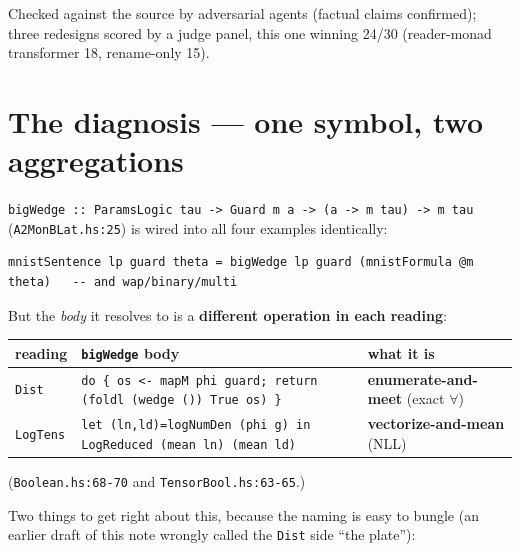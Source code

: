 \documentclass[11pt]{article}
\newcommand{\code}[1]{\texttt{#1}}
\begin{document}
Checked against the source by adversarial agents (factual claims confirmed); three redesigns scored by a
judge panel, this one winning 24/30 (reader-monad transformer 18, rename-only 15).

\section*{The diagnosis --- one symbol, two aggregations}

\code{bigWedge :: ParamsLogic tau -> Guard m a -> (a -> m tau) -> m tau} (\code{A2MonBLat.hs:25}) is
wired into all four examples identically:

\begin{lstlisting}
mnistSentence lp guard theta = bigWedge lp guard (mnistFormula @m theta)   -- and wap/binary/multi
\end{lstlisting}

But the \emph{body} it resolves to is a \textbf{different operation in each reading}:

\begin{center}
\begin{tabular}{@{}lll@{}}
\toprule
reading & \code{bigWedge} body & what it is \\
\midrule
\code{Dist}   & \code{do \{ os <- mapM phi guard; return (foldl (wedge ()) True os) \}} & \textbf{enumerate-and-meet} (exact $\forall$) \\
\code{LogTens} & \code{let (ln,ld)=logNumDen (phi g) in LogReduced (mean ln) (mean ld)} & \textbf{vectorize-and-mean} (NLL) \\
\bottomrule
\end{tabular}
\end{center}
\noindent(\code{Boolean.hs:68-70} and \code{TensorBool.hs:63-65}.)

Two things to get right about this, because the naming is easy to bungle (an earlier draft of this note
wrongly called the \code{Dist} side ``the plate''):
\end{document}
